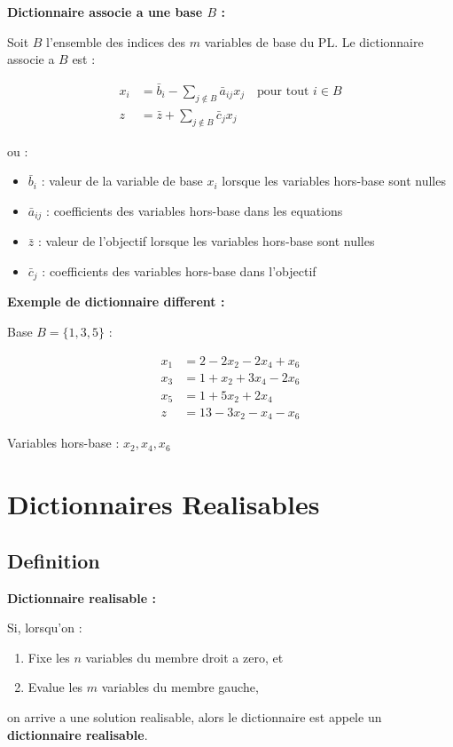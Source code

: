 \documentclass[12pt,a4paper]{article}
\begin{document}
\begin{definition}
\textbf{Dictionnaire associe a une base $B$ :}

Soit $B$ l'ensemble des indices des $m$ variables de base du PL. Le dictionnaire associe a $B$ est :

\begin{align*}
x_i &= \bar{b}_i - \sum_{j \notin B} \bar{a}_{ij}x_j \quad \text{pour tout } i \in B\\
z &= \bar{z} + \sum_{j \notin B} \bar{c}_j x_j
\end{align*}

ou :
\begin{itemize}
    \item $\bar{b}_i$ : valeur de la variable de base $x_i$ lorsque les variables hors-base sont nulles
    \item $\bar{a}_{ij}$ : coefficients des variables hors-base dans les equations
    \item $\bar{z}$ : valeur de l'objectif lorsque les variables hors-base sont nulles
    \item $\bar{c}_j$ : coefficients des variables hors-base dans l'objectif
\end{itemize}
\end{definition}

\begin{exemple}
\textbf{Exemple de dictionnaire different :}

Base $B = \{1, 3, 5\}$ :

\begin{align*}
x_1 &= 2 - 2x_2 - 2x_4 + x_6\\
x_3 &= 1 + x_2 + 3x_4 - 2x_6\\
x_5 &= 1 + 5x_2 + 2x_4\\
z &= 13 - 3x_2 - x_4 - x_6
\end{align*}

Variables hors-base : $x_2, x_4, x_6$
\end{exemple}

\newpage
\section{Dictionnaires Realisables}

\subsection{Definition}

\begin{definition}
\textbf{Dictionnaire realisable :}

Si, lorsqu'on :
\begin{enumerate}
    \item Fixe les $n$ variables du membre droit a zero, et
    \item Evalue les $m$ variables du membre gauche,
\end{enumerate}

on arrive a une solution realisable, alors le dictionnaire est appele un \textcolor{defvert}{\textbf{dictionnaire realisable}}.
\end{definition}
\end{document}
